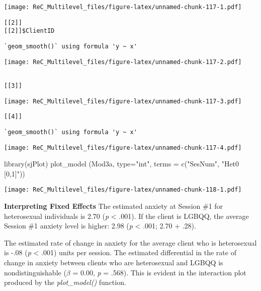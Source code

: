 \documentclass[
  11pt,
]{book}
\newenvironment{Shaded}{\begin{snugshade}}{\end{snugshade}}
\newcommand{\AttributeTok}[1]{\textcolor[rgb]{0.77,0.63,0.00}{#1}}
\newcommand{\FunctionTok}[1]{\textcolor[rgb]{0.00,0.00,0.00}{#1}}
\newcommand{\NormalTok}[1]{#1}
\newcommand{\StringTok}[1]{\textcolor[rgb]{0.31,0.60,0.02}{#1}}
\begin{document}
\texttt{[image: ReC\_Multilevel\_files/figure-latex/unnamed-chunk-117-1.pdf]}

\begin{verbatim}
[[2]]
[[2]]$ClientID
\end{verbatim}

\begin{verbatim}
`geom_smooth()` using formula 'y ~ x'
\end{verbatim}

\texttt{[image: ReC\_Multilevel\_files/figure-latex/unnamed-chunk-117-2.pdf]}

\begin{verbatim}

[[3]]
\end{verbatim}

\texttt{[image: ReC\_Multilevel\_files/figure-latex/unnamed-chunk-117-3.pdf]}

\begin{verbatim}
[[4]]
\end{verbatim}

\begin{verbatim}
`geom_smooth()` using formula 'y ~ x'
\end{verbatim}

\texttt{[image: ReC\_Multilevel\_files/figure-latex/unnamed-chunk-117-4.pdf]}

\begin{Shaded}
\begin{Highlighting}[]
\FunctionTok{library}\NormalTok{(sjPlot)}
\FunctionTok{plot\_model}\NormalTok{ (Mod3a, }\AttributeTok{type=}\StringTok{"int"}\NormalTok{, }\AttributeTok{terms =} \FunctionTok{c}\NormalTok{(}\StringTok{"SesNum"}\NormalTok{, }\StringTok{"Het0 [0,1]"}\NormalTok{))}
\end{Highlighting}
\end{Shaded}

\texttt{[image: ReC\_Multilevel\_files/figure-latex/unnamed-chunk-118-1.pdf]}

\textbf{Interpreting Fixed Effects}
The estimated anxiety at Session \#1 for heterosexual individuals is 2.70 (\emph{p} \textless{} .001). If the client is LGBQQ, the average Session \#1 anxiety level is higher: 2.98 (\emph{p} \textless{} .001; 2.70 + .28).

The estimated rate of change in anxiety for the average client who is heterosexual is -.08 (\emph{p} \textless{} .001) units per session. The estimated differential in the rate of change in anxiety between clients who are heterosexual and LGBQQ is nondistinguishable (\(\beta\) = 0.00, \emph{p} = .568). This is evident in the interaction plot produced by the \emph{plot\_model()} function.
\end{document}
